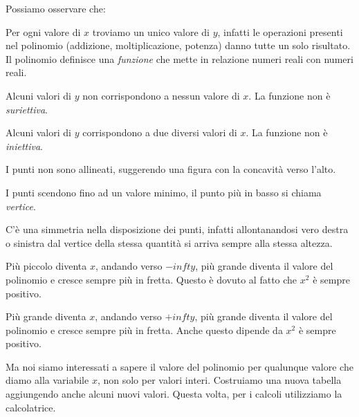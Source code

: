 Possiamo osservare che:
\begin{enumerate*}
 \item Per ogni valore di \(x\) troviamo un unico valore di \(y\), infatti 
  le operazioni presenti nel polinomio (addizione, moltiplicazione, potenza) 
  danno tutte un solo risultato. Il polinomio definisce una \emph{funzione}
  che mette in relazione numeri reali con numeri reali.
 \item Alcuni valori di \(y\) non corrispondono a nessun valore di \(x\). 
  La funzione non è \emph{suriettiva}.
 \item Alcuni valori di \(y\) corrispondono a due diversi valori di \(x\).
  La funzione non è \emph{iniettiva}.
 \item I punti non sono allineati, suggerendo una figura con 
 la concavità verso l'alto.
 \item I punti scendono fino ad un valore minimo, il punto più in basso si 
  chiama \emph{vertice}.
 \item C'è una simmetria nella disposizione dei punti, infatti allontanandosi 
  vero destra o sinistra dal vertice della stessa quantità si arriva sempre 
  alla stessa altezza.
 \item Più piccolo diventa \(x\), andando verso \(-infty\), più grande diventa il 
  valore del polinomio e cresce sempre più in fretta. 
  Questo è dovuto al fatto che \(x^2\) è sempre positivo.
 \item Più grande diventa \(x\), andando verso \(+infty\), più grande diventa il 
  valore del polinomio e cresce sempre più in fretta. 
  Anche questo dipende da \(x^2\) è sempre positivo.
\end{enumerate*}

Ma noi siamo interessati a sapere il valore del polinomio per qualunque valore 
che diamo alla variabile \(x\), non solo per valori interi. Costruiamo una nuova 
tabella aggiungendo anche alcuni nuovi valori. Questa volta, per i calcoli 
utilizziamo la calcolatrice.

